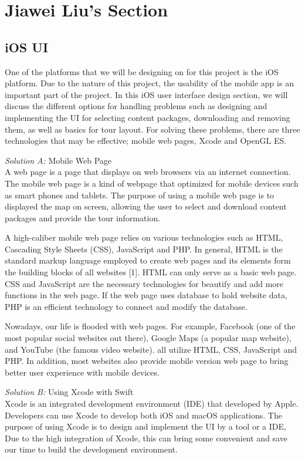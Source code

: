 \documentclass[letterpaper, 10pt,titlepage]{article}
\begin{document}
\vspace{0.3cm}




\section{Jiawei Liu's Section}

\subsection{iOS UI}
One of the platforms that we will be designing on for this project is the iOS platform. Due to the nature of this project, the usability of the mobile app is an important part of the project. In this iOS user interface design section, we will discuss the different options for handling problems such as designing and implementing the UI for selecting content packages, downloading and removing them, as well as basics for tour layout. For solving these problems, there are three technologies that may be effective; mobile web pages, Xcode and OpenGL ES.


\textit{Solution A:} Mobile Web Page\\
A web page is a page that displays on web browsers via an internet connection. The mobile web page is a kind of webpage that optimized for mobile devices such as smart phones and tablets. The purpose of using a mobile web page is to displayed the map on screen, allowing the user to select and download content packages and provide the tour information.


A high-caliber mobile web page relies on various technologies such as HTML, Cascading Style Sheets (CSS), JavaScript and PHP. In general, HTML is the standard markup language employed to create web pages and its elements form the building blocks of all websites [1]. HTML can only serve as a basic web page. CSS and JavaScript are the necessary technologies for beautify and add more functions in the web page. If the web page uses database to hold website data, PHP is an efficient technology to connect and modify the database. 


Nowadays, our life is flooded with web pages. For example, Facebook (one of the most popular social websites out there), Google Maps (a popular map website), and YouTube (the famous video website). all utilize HTML, CSS, JavaScript and PHP. In addition, most websites also provide mobile version web page to bring better user experience with mobile devices.


\textit{Solution B:} Using Xcode with Swift\\
Xcode is an integrated development environment (IDE) that developed by Apple. Developers can use Xcode to develop both iOS and macOS applications. The purpose of using Xcode is to design and implement the UI by a tool or a IDE, Due to the high integration of Xcode, this can bring some convenient and save our time to build the development environment.
\end{document}
